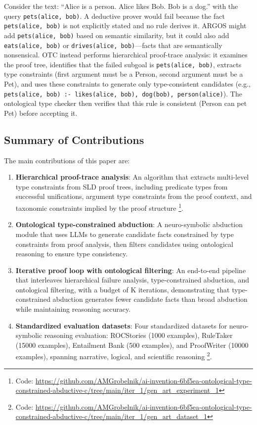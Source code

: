 \documentclass[11pt,letterpaper]{article}
\begin{document}
Consider the text: ``Alice is a person. Alice likes Bob. Bob is a dog.'' with the query \texttt{pets(alice, bob)}. A deductive prover would fail because the fact \texttt{pets(alice, bob)} is not explicitly stated and no rule derives it. ARGOS might add \texttt{pets(alice, bob)} based on semantic similarity, but it could also add \texttt{eats(alice, bob)} or \texttt{drives(alice, bob)}---facts that are semantically nonsensical. OTC instead performs hierarchical proof-trace analysis: it examines the proof tree, identifies that the failed subgoal is \texttt{pets(alice, bob)}, extracts type constraints (first argument must be a Person, second argument must be a Pet), and uses these constraints to generate only type-consistent candidates (e.g., \texttt{pets(alice, bob) :- likes(alice, bob), dog(bob), person(alice)}). The ontological type checker then verifies that this rule is consistent (Person can pet Pet) before accepting it.

\subsection{Summary of Contributions}

The main contributions of this paper are:

\begin{enumerate}
    \item \textbf{Hierarchical proof-trace analysis}: An algorithm that extracts multi-level type constraints from SLD proof trees, including predicate types from successful unifications, argument type constraints from the proof context, and taxonomic constraints implied by the proof structure \footnote{Code: \url{https://github.com/AMGrobelnik/ai-invention-6bf5ea-ontological-type-constrained-abductive-c/tree/main/iter_1/gen_art_experiment_1}}.
    
    \item \textbf{Ontological type-constrained abduction}: A neuro-symbolic abduction module that uses LLMs to generate candidate facts constrained by type constraints from proof analysis, then filters candidates using ontological reasoning to ensure type consistency.
    
    \item \textbf{Iterative proof loop with ontological filtering}: An end-to-end pipeline that interleaves hierarchical failure analysis, type-constrained abduction, and ontological filtering, with a budget of K iterations, demonstrating that type-constrained abduction generates fewer candidate facts than broad abduction while maintaining reasoning accuracy.
    
    \item \textbf{Standardized evaluation datasets}: Four standardized datasets for neuro-symbolic reasoning evaluation: ROCStories (1000 examples), RuleTaker (15000 examples), Entailment Bank (500 examples), and ProofWriter (10000 examples), spanning narrative, logical, and scientific reasoning \footnote{Code: \url{https://github.com/AMGrobelnik/ai-invention-6bf5ea-ontological-type-constrained-abductive-c/tree/main/iter_1/gen_art_dataset_1}}.
\end{enumerate}
\end{document}
